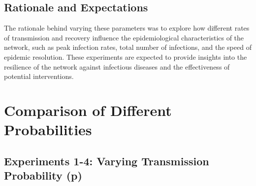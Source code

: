 \documentclass[
	report, %
	11pt, %
]{CSUniSchoolLabReport}
\newcounter{ct}
\begin{document}
\subsection{Rationale and Expectations}
The rationale behind varying these parameters was to explore how different rates of transmission and recovery influence the epidemiological characteristics of the network, such as peak infection rates, total number of infections, and the speed of epidemic resolution. These experiments are expected to provide insights into the resilience of the network against infectious diseases and the effectiveness of potential interventions.


\section{Comparison of Different Probabilities}
\subsection{Experiments 1-4: Varying Transmission Probability (p)}
    \thispagestyle{empty} %
	\fancyfoot[R]{\thepage} %
\end{document}

